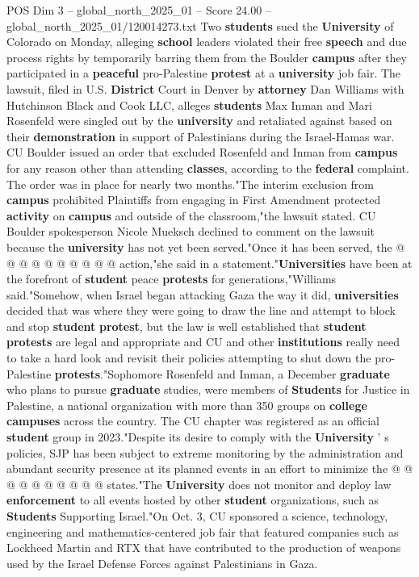 \begin{textsample}{POS Dim 3 – global\_north\_2025\_01 – Score 24.00 – global\_north\_2025\_01/120014273.txt}  \label{ex:f3_pos_258}
Two \textbf{students} sued the \textbf{University} of Colorado on Monday, alleging \textbf{school} leaders violated their free \textbf{speech} and due process rights by temporarily barring them from the Boulder \textbf{campus} after they participated in a \textbf{peaceful} pro-Palestine \textbf{protest} at a \textbf{university} job fair.
The lawsuit, filed in U.S. \textbf{District} Court in Denver by \textbf{attorney} Dan Williams with Hutchinson Black and Cook LLC, alleges \textbf{students} Max Inman and Mari Rosenfeld were singled out by the \textbf{university} and retaliated against based on their \textbf{demonstration} in support of Palestinians during the Israel-Hamas war.
CU Boulder issued an order that excluded Rosenfeld and Inman from \textbf{campus} for any reason other than attending \textbf{classes}, according to the \textbf{federal} complaint.
The order was in place for nearly two months."The interim exclusion from \textbf{campus} prohibited Plaintiffs from engaging in First Amendment protected \textbf{activity} on \textbf{campus} and outside of the classroom,"the lawsuit stated.
CU Boulder spokesperson Nicole Mueksch declined to comment on the lawsuit because the \textbf{university} has not yet been served."Once it has been served, the @ @ @ @ @ @ @ @ @ @ action,"she said in a statement."\textbf{Universities} have been at the forefront of \textbf{student} peace \textbf{protests} for generations,"Williams said."Somehow, when Israel began attacking Gaza the way it did, \textbf{universities} decided that was where they were going to draw the line and attempt to block and stop \textbf{student} \textbf{protest}, but the law is well established that \textbf{student} \textbf{protests} are legal and appropriate and CU and other \textbf{institutions} really need to take a hard look and revisit their policies attempting to shut down the pro-Palestine \textbf{protests}."Sophomore Rosenfeld and Inman, a December \textbf{graduate} who plans to pursue \textbf{graduate} studies, were members of \textbf{Students} for Justice in Palestine, a national organization with more than 350 groups on \textbf{college} \textbf{campuses} across the country.
The CU chapter was registered as an official \textbf{student} group in 2023."Despite its desire to comply with the \textbf{University} ' s policies, SJP has been subject to extreme monitoring by the administration and abundant security presence at its planned events in an effort to minimize the @ @ @ @ @ @ @ @ @ @ states."The \textbf{University} does not monitor and deploy law \textbf{enforcement} to all events hosted by other \textbf{student} organizations, such as \textbf{Students} Supporting Israel."On Oct. 3, CU sponsored a science, technology, engineering and mathematics-centered job fair that featured companies such as Lockheed Martin and RTX that have contributed to the production of weapons used by the Israel Defense Forces against Palestinians in Gaza.

\end{textsample}

